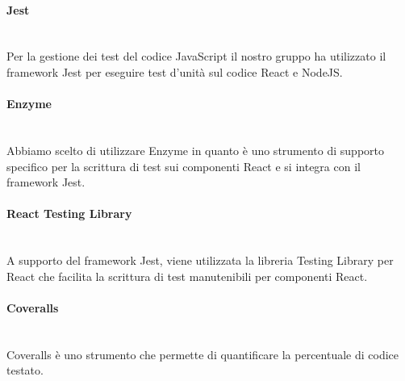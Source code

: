 	\paragraph{Jest}\mbox{}\\ [1mm]
	Per la gestione dei test del codice JavaScript il nostro gruppo ha utilizzato il framework Jest per eseguire test d'unità sul codice React e NodeJS.
	\paragraph{Enzyme}\mbox{}\\ [1mm]
	Abbiamo scelto di utilizzare Enzyme in quanto è uno strumento di supporto specifico per la scrittura di test sui componenti React e si integra con il framework Jest.
	\paragraph{React Testing Library}\mbox{}\\ [1mm]
	A supporto del framework Jest, viene utilizzata la libreria Testing Library per React che facilita la scrittura di test manutenibili per componenti React.
	\paragraph{Coveralls}\mbox{}\\ [1mm]
	Coveralls è uno strumento che permette di quantificare la percentuale di codice testato.
